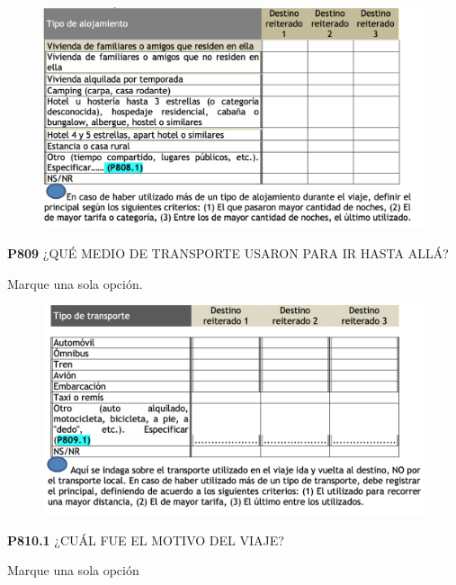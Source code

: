 \documentclass[
  openany]{book}
\begin{document}
\begin{figure}

{\centering \includegraphics[width=1\linewidth]{imagenes/figura6-262} 

}

\end{figure}

\textbf{P809} ¿QUÉ MEDIO DE TRANSPORTE USARON PARA IR HASTA ALLÁ?

Marque una sola opción.

\begin{figure}

{\centering \includegraphics[width=1\linewidth]{imagenes/figura6-263} 

}

\end{figure}

\textbf{P810.1} ¿CUÁL FUE EL MOTIVO DEL VIAJE?

Marque una sola opción
\end{document}
